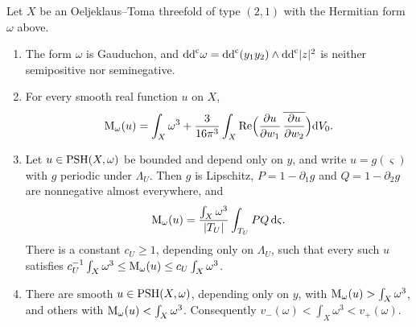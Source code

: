 \begin{proposition}\label{prop:ot-threefold-mass}
Let $X$ be an Oeljeklaus--Toma threefold of type $(2,1)$ with the Hermitian form $\omega$ above.
\begin{enumerate}
\item The form $\omega$ is Gauduchon, and $\mathrm{dd}^{\mathrm{c}}\omega=\mathrm{dd}^{\mathrm{c}}(y_1y_2)\wedge\mathrm{dd}^{\mathrm{c}}|z|^2$ is neither semipositive nor seminegative.
\item For every smooth real function $u$ on $X$,
\[
 \mathrm M_\omega(u)=\int_X\omega^3+\frac{3}{16\pi^3}\int_X
 \operatorname{Re}\Bigl(\frac{\partial u}{\partial w_1}\,
       \overline{\frac{\partial u}{\partial w_2}}\Bigr)\mathrm dV_0.
\]
\item Let $u\in\mathrm{PSH}(X,\omega)$ be bounded and depend only on $y$, and write $u=g(\varsigma)$ with $g$ periodic under $\Lambda_U$. Then $g$ is Lipschitz, $P=1-\partial_1g$ and $Q=1-\partial_2g$ are nonnegative almost everywhere, and
\[
 \mathrm M_\omega(u)=\frac{\int_X\omega^3}{|T_U|}\int_{T_U}PQ\,\mathrm d\varsigma.
\]
There is a constant $c_U\geq1$, depending only on $\Lambda_U$, such that every such $u$ satisfies $c_U^{-1}\int_X\omega^3\leq\mathrm M_\omega(u)\leq c_U\int_X\omega^3$.
\item There are smooth $u\in\mathrm{PSH}(X,\omega)$, depending only on $y$, with $\mathrm M_\omega(u)>\int_X\omega^3$, and others with $\mathrm M_\omega(u)<\int_X\omega^3$. Consequently $v_-(\omega)<\int_X\omega^3<v_+(\omega)$.
\end{enumerate}
\end{proposition}
